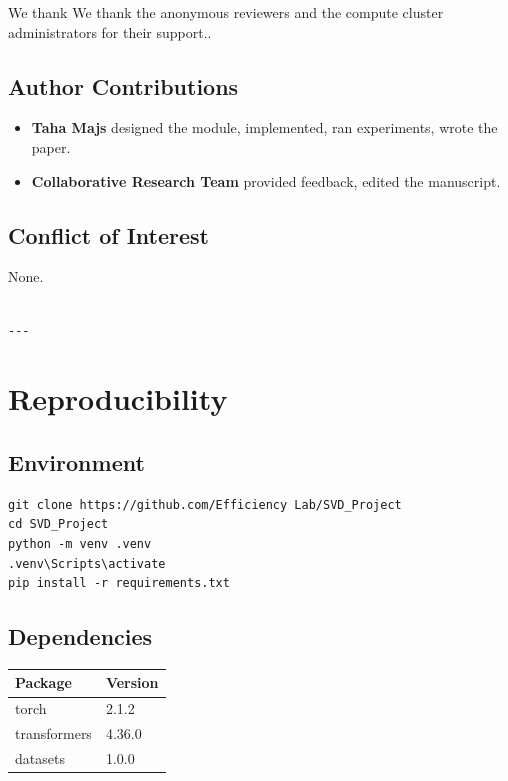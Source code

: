 We thank We thank the anonymous reviewers and the compute cluster administrators for their support..

\subsection{Author Contributions}

\begin{itemize}
\item \textbf{Taha Majs} designed the module, implemented, ran experiments, wrote
  the paper.
\item \textbf{Collaborative Research Team} provided feedback, edited the manuscript.

\end{itemize}
\subsection{Conflict of Interest}

None.
\begin{lstlisting}

---
\end{lstlisting}

\section{Reproducibility}

\subsection{Environment}

\begin{lstlisting}
git clone https://github.com/Efficiency Lab/SVD_Project
cd SVD_Project
python -m venv .venv
.venv\Scripts\activate
pip install -r requirements.txt
\end{lstlisting}

\subsection{Dependencies}

\begin{table}[H]
\centering
\small
\begin{tabular}{ll}
\toprule
\textbf{Package} & \textbf{Version} \\
\midrule
torch & 2.1.2 \\
transformers & 4.36.0 \\
datasets & 1.0.0 \\
\bottomrule
\end{tabular}
\end{table}

